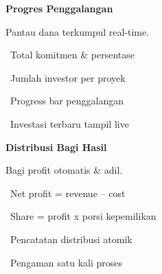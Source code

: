 \documentclass[a4paper]{article}
\begin{document}
\vspace{8pt}

\noindent
\begin{minipage}[t]{0.485\textwidth}
    \colorbox{PurplePrimary}{%
        \begin{minipage}{\dimexpr\textwidth-2\fboxsep\relax}
            {\fontsize{10}{13}\selectfont\bfseries\color{White} Progres Penggalangan}
        \end{minipage}}\par
    \vspace{4pt}
    {\fontsize{9}{12}\selectfont\color{TextDark}%
    Pantau dana terkumpul real-time.\par\vspace{3pt}
    \textbullet\ Total komitmen \& persentase\par\vspace{2pt}%
    \textbullet\ Jumlah investor per proyek\par\vspace{2pt}%
    \textbullet\ Progress bar penggalangan\par\vspace{2pt}%
    \textbullet\ Investasi terbaru tampil live}%

\end{minipage}%
\hfill
\begin{minipage}[t]{0.485\textwidth}
    \colorbox{BlueDark}{%
        \begin{minipage}{\dimexpr\textwidth-2\fboxsep\relax}
            {\fontsize{10}{13}\selectfont\bfseries\color{White} Distribusi Bagi Hasil}
        \end{minipage}}\par
    \vspace{4pt}
    {\fontsize{9}{12}\selectfont\color{TextDark}%
    Bagi profit otomatis \& adil.\par\vspace{3pt}
    \textbullet\ Net profit = revenue -- cost\par\vspace{2pt}%
    \textbullet\ Share = profit x porsi kepemilikan\par\vspace{2pt}%
    \textbullet\ Pencatatan distribusi atomik\par\vspace{2pt}%
    \textbullet\ Pengaman satu kali proses}%

\end{minipage}

\vspace{8pt}
\end{document}
